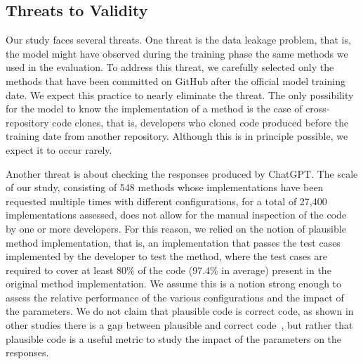 


\subsection{Threats to Validity}
Our study faces several threats. One threat is the data leakage problem, that is, the model might have observed during the training phase the same methods we used in the evaluation. To address this threat, we carefully selected only the methods that have been committed on GitHub after the official model training date. We expect this practice to nearly eliminate the threat. The only possibility for the model to know the implementation of a method is the case of cross-repository code clones, that is, developers who cloned code produced before the training date from another repository. Although this is in principle possible, we expect it to occur rarely.

Another threat is about checking the responses produced by ChatGPT. The scale of our study, consisting of 548 methods whose implementations have been requested multiple times with different configurations, for a total of 27,400 implementations assessed, does not allow for the manual inspection of the code by one or more developers. For this reason, we relied on the notion of plausible method implementation, that is, an implementation that passes the test cases implemented by the developer to test the method, where the test cases are required to cover at least 80\% of the code (97.4\% in average) present in the original method implementation. We assume this is a notion strong enough to assess the relative performance of the various configurations and the impact of the parameters. We do not claim that plausible code is correct code, as shown in other studies there is a gap between plausible and correct code~\cite{Corso:EmpiricalAssessment:ICPC:2024}, but rather that plausible code is a useful metric to study the impact of the parameters on the responses.   

